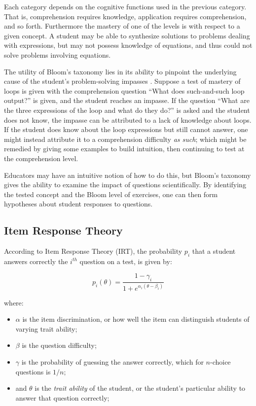 \documentclass[a4paper,twocolumn]{article}
\begin{document}
Each category depends on the cognitive functions used in the previous category.
That is, comprehension requires knowledge, application requires comprehension,
and so forth.  Furthermore the mastery of one of the levels is with respect to
a given concept.  A student may be able to synthesize solutions to problems
dealing with expressions, but may not possess knowledge of equations, and thus
could not solve problems involving equations.

The utility of Bloom's taxonomy lies in its ability to pinpoint the underlying
cause of the student's problem-solving impasses \cite{shuhidan2011}.  Suppose a
test of mastery of loops is given with the comprehension question ``What does
such-and-such loop output?'' is given, and the student reaches an impasse.  If
the question ``What are the three expressions of the loop and what do they
do?'' is asked and the student does not know, the impasse can be attributed to
a lack of knowledge about loops.  If the student does know about the loop
expressions but still cannot answer, one might instead attribute it to a
comprehension difficulty \emph{as such}; which might be remedied by giving some
examples to build intuition, then continuing to test at the comprehension
level.

Educators may have an intuitive notion of how to do this, but Bloom's taxonomy
gives the ability to examine the impact of questions scientifically.  By
identifying the tested concept and the Bloom level of exercises, one can then
form hypotheses about student responses to questions.  


\subsection{Item Response Theory}

According to Item Response Theory (IRT), the probability $p_i$ that a
student answers correctly the $i^{th}$ question on a test, is given
by:

\[
  p_i(\theta) = \frac{1-\gamma_i}{1+e^{\alpha_i(\theta-\beta_i)}}
\]

where:

\begin{itemize} 

 \item $\alpha$ is the item discrimination, or how well the item can
 distinguish students of varying trait ability;

 \item $\beta$ is the question difficulty;

 \item $\gamma$ is the probability of guessing the answer correctly,
 which for $n$-choice questions is $1/n$;

 \item and $\theta$ is the \emph{trait ability} of the student, or the
 student's particular ability to answer that question correctly;

\end{itemize} 
\end{document}
